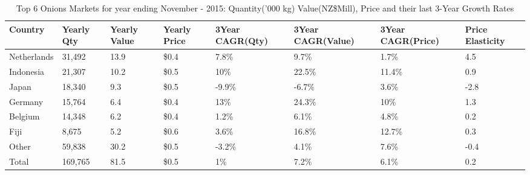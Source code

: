 \begin{table}[ht]
\centering
{\scriptsize
\begin{tabular}[t]{p{1.8cm}>{\hfill}p{1.4cm}>{\hfill}p{1.4cm}>{\hfill}p{1.6cm}>{\hfill}p{1.9cm}>{\hfill}p{2cm}>{\hfill}p{1.9cm}>{\hfill}p{1.5cm}}
 \textbf{Country} & \textbf{Yearly Qty} & \textbf{Yearly Value} & \textbf{Yearly Price} & \textbf{3Year CAGR(Qty)} & \textbf{3Year CAGR(Value)} & \textbf{3Year CAGR(Price)} & \textbf{Price Elasticity} \\
\hline
Netherlands & 31,492 & 13.9 & \$0.4 & 7.8\% & 9.7\% & 1.7\% & 4.5 \\  
Indonesia & 21,307 & 10.2 & \$0.5 & 10\% & 22.5\% & 11.4\% & 0.9 \\  
Japan & 18,340 & 9.3 & \$0.5 & -9.9\% & -6.7\% & 3.6\% & -2.8 \\  
Germany & 15,764 & 6.4 & \$0.4 & 13\% & 24.3\% & 10\% & 1.3 \\  
Belgium & 14,348 & 6.2 & \$0.4 & 1.2\% & 6.1\% & 4.8\% & 0.2 \\  
Fiji & 8,675 & 5.2 & \$0.6 & 3.6\% & 16.8\% & 12.7\% & 0.3 \\  
Other & 59,838 & 30.2 & \$0.5 & -3.2\% & 4.1\% & 7.6\% & -0.4 \\  
Total & 169,765 & 81.5 & \$0.5 & 1\% & 7.2\% & 6.1\% & 0.2 \\  
\hline
\end{tabular}
}
\caption{\scriptsize Top 6 Onions Markets for year ending November - 2015: Quantity('000 kg) Value(NZ\$Mill), Price and their last 3-Year Growth Rates}
\end{table}

